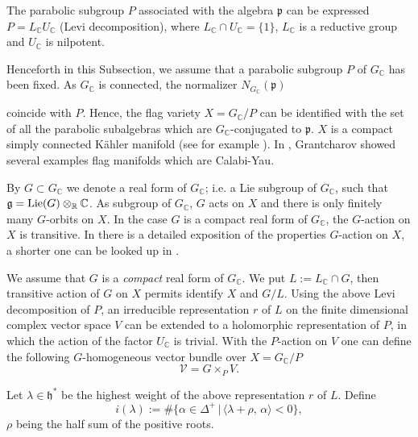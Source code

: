 \documentclass[xypic,amscd,syntonly,amssymb,verbatim,12pt]{amsart}
\theoremstyle{plain}
\theoremstyle{definition}
\theoremstyle{remark}
\numberwithin{equation}{section}
\begin{document}
  The parabolic subgroup $P$ associated
 with the algebra ${\mathfrak p}$ can be expressed $P=L_{\mathbb C}U_{\mathbb C}$ (Levi decomposition), where
 $L_{\mathbb C}\cap U_{\mathbb C}=\{1\}$,
 $L_{\mathbb C}$ is a reductive group and $U_{\mathbb C}$ is nilpotent.

 Henceforth in this Subsection, we assume that a parabolic subgroup $P$ of $G_{\mathbb C}$ has been fixed. As $G_{\mathbb C}$ is
  connected, the normalizer $N_{G_{\mathbb C}}({\mathfrak
 p})$
 
 coincide with $P$. Hence, the  flag variety
 $X=G_{\mathbb C}/P$ can be identified with the set of all the parabolic subalgebras which are $G_{\mathbb C}$-conjugated to ${\mathfrak
 p}$.
 $X$ is a compact simply connected K\"ahler
 manifold (see for example \cite{Borel, W1}).  In \cite{Grant}, Grantcharov showed several examples
  flag manifolds which are Calabi-Yau.



By $G\subset G_{\mathbb C}$ we denote a real form of $G_{\mathbb
C}$; i.e. a Lie subgroup of $G_{\mathbb C}$, such that ${\mathfrak
g}= {\rm Lie}(G)\otimes_{\mathbb R}{\mathbb C}$.
 As subgroup of $G_{\mathbb C}$, $G$ acts on $X$ and there is only finitely
many $G$-orbits on $X$. In the case $G$ is
 a compact real form of $G_{\mathbb C}$, the  $G$-action on $X$ is transitive. In \cite{W} there is
  a detailed exposition of the properties $G$-action on $X$, a shorter one  can be looked up in \cite{Z}.



 We assume that $G$ is a {\em compact} real form of $G_{\mathbb C}$. We put $L:=L_{\mathbb C}\cap G$,
 then transitive action of $G$ on $X$ permits identify $X$ and $G/L$.
 Using the above Levi decomposition of $P$, an irreducible
representation $r$ of $L$ on the finite dimensional complex vector
space $V$ can be extended to a holomorphic representation of $P$,
in which the action of the factor $U_{\mathbb C}$ is trivial.
With the $P$-action on $V$ one can define the following
$G$-homogeneous vector bundle over $X=G_{\mathbb C}/P$
\begin{equation}\label{mathcalV}
{\mathcal V}=G\times_P V.
\end{equation}

Let $\lambda\in{\mathfrak h}^*$ be the highest weight of the above
representation $r$ of $L$. Define
\begin{equation}\label{ilambda}
 i({\lambda}):=\#\{\alpha\in\Delta^+\,|\,\langle
\lambda+\rho,\,\alpha\rangle<0  \},
 \end{equation}
  $\rho$ being the half sum of the positive roots.
\end{document}
